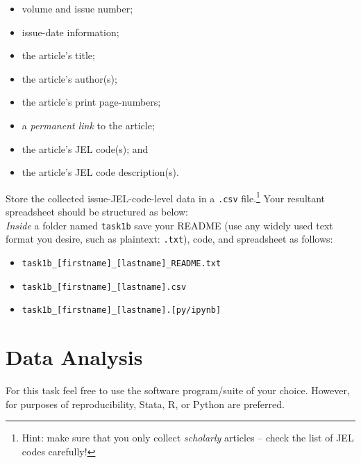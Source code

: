 \documentclass[11pt, letterpaper, twoside]{article}
\begin{document}
\begin{multicols}{2}
    \begin{itemize}
        \item volume and issue number;
        \item issue-date information;
        \item the article's title;
        \item the article's author(s);
        \item the article's print page-numbers;
        \item a \textit{permanent link} to the article;
        \item the article's JEL code(s); and 
        \item the article's JEL code description(s).
    \end{itemize}   
\end{multicols}

Store the collected issue-JEL-code-level data in a \verb|.csv| file.\footnote{Hint: make sure that you only collect \textit{scholarly} articles -- check the list of JEL codes carefully!} Your resultant spreadsheet should be structured as below:\\

\textit{Inside} a folder named \verb|task1b| save your README (use any widely used text format you desire, such as plaintext: \verb|.txt|), code, and spreadsheet as follows:
\begin{itemize}
    \item \verb|task1b_[firstname]_[lastname]_README.txt|
    \item \verb|task1b_[firstname]_[lastname].csv|
    \item \verb|task1b_[firstname]_[lastname].[py/ipynb]|
\end{itemize}

\begin{landscape}
    \thispagestyle{empty}
    
\end{landscape}

\section{Data Analysis}

For this task feel free to use the software program/suite of your choice. However, for purposes of reproducibility, Stata, R, or Python are preferred.
\end{document}

